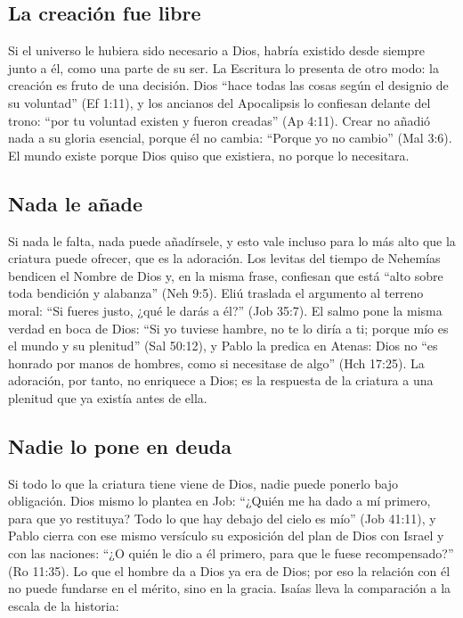 \subsection{La creación fue libre}

Si el universo le hubiera sido necesario a Dios, habría existido desde siempre junto a él, como una parte de su ser. La Escritura lo presenta de otro modo: la creación es fruto de una decisión. Dios ``hace todas las cosas según el designio de su voluntad'' (Ef 1:11), y los ancianos del Apocalipsis lo confiesan delante del trono: ``por tu voluntad existen y fueron creadas'' (Ap 4:11). Crear no añadió nada a su gloria esencial, porque él no cambia: ``Porque yo \SENOR{} no cambio'' (Mal 3:6). El mundo existe porque Dios quiso que existiera, no porque lo necesitara.

\subsection{Nada le añade}

Si nada le falta, nada puede añadírsele, y esto vale incluso para lo más alto que la criatura puede ofrecer, que es la adoración. Los levitas del tiempo de Nehemías bendicen el Nombre de Dios y, en la misma frase, confiesan que está ``alto sobre toda bendición y alabanza'' (Neh 9:5). Eliú traslada el argumento al terreno moral: ``Si fueres justo, ¿qué le darás a él?'' (Job 35:7). El salmo pone la misma verdad en boca de Dios: ``Si yo tuviese hambre, no te lo diría a ti; porque mío es el mundo y su plenitud'' (Sal 50:12), y Pablo la predica en Atenas: Dios no ``es honrado por manos de hombres, como si necesitase de algo'' (Hch 17:25). La adoración, por tanto, no enriquece a Dios; es la respuesta de la criatura a una plenitud que ya existía antes de ella.

\subsection{Nadie lo pone en deuda}

Si todo lo que la criatura tiene viene de Dios, nadie puede ponerlo bajo obligación. Dios mismo lo plantea en Job: ``¿Quién me ha dado a mí primero, para que yo restituya? Todo lo que hay debajo del cielo es mío'' (Job 41:11), y Pablo cierra con ese mismo versículo su exposición del plan de Dios con Israel y con las naciones: ``¿O quién le dio a él primero, para que le fuese recompensado?'' (Ro 11:35). Lo que el hombre da a Dios ya era de Dios; por eso la relación con él no puede fundarse en el mérito, sino en la gracia. Isaías lleva la comparación a la escala de la historia:

